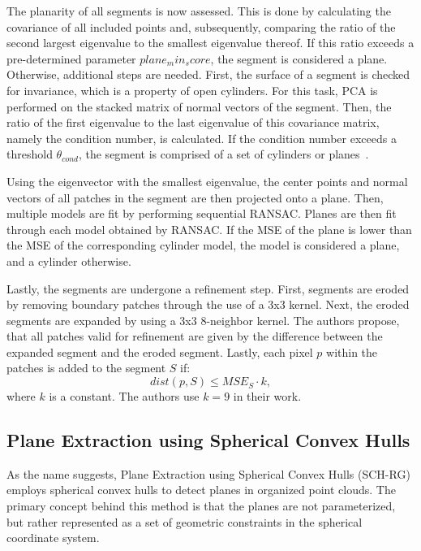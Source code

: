 \documentclass[main.tex]{subfiles}
\begin{document}
The planarity of all segments is now assessed. This is done by calculating the covariance of all included points and,
subsequently, comparing the ratio of the second largest eigenvalue to the smallest eigenvalue thereof. If this ratio
exceeds a pre-determined parameter $plane_min_score$, the segment is considered a plane.
Otherwise, additional steps are needed.
First, the surface of a segment is checked for invariance, which is a property of open cylinders.
For this task, PCA is performed on the stacked matrix of normal vectors of the segment.
Then, the ratio of the first eigenvalue to the last eigenvalue of this covariance matrix, namely the condition number,
is calculated. If the condition number exceeds a threshold $\theta_{cond}$, the segment is comprised of a set of
cylinders or planes~\cite[Section~III.D]{Proença_Gao_2018}.

Using the eigenvector with the smallest eigenvalue, the center points and normal vectors of all patches
in the segment are then projected onto a plane. Then, multiple models are fit by performing sequential RANSAC.
Planes are then fit through each model obtained by RANSAC. If the MSE of the plane is lower than the MSE of
the corresponding cylinder model, the model is considered a plane, and a cylinder otherwise.

Lastly, the segments are undergone a refinement step.
First, segments are eroded by removing boundary patches through the use of a 3x3 kernel. Next, the eroded segments are expanded by using
a 3x3 8-neighbor kernel. The authors propose, that all patches valid for refinement are given by the difference between
the expanded segment and the eroded segment. Lastly, each pixel $p$ within the patches is added to
the segment $S$ if:
\begin{equation}
    dist(p,S) \leq MSE_S \cdot k,
\end{equation}
where $k$ is a constant. The authors use $k=9$ in their work.

\subsection{Plane Extraction using Spherical Convex Hulls}
\label{subsec:bg-schrg}
As the name suggests, Plane Extraction using Spherical Convex Hulls (SCH-RG) employs spherical convex hulls to
detect planes in organized point clouds.
The primary concept behind this method is that the planes are not parameterized, but rather represented as
a set of geometric constraints in the spherical coordinate system.
\end{document}
